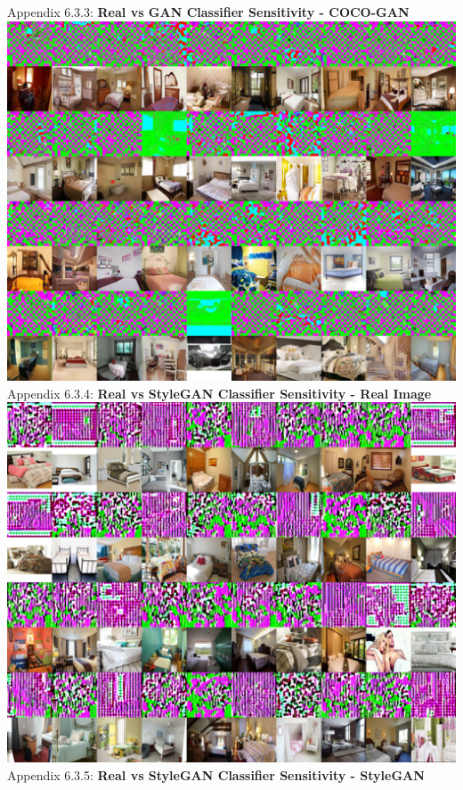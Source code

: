 \documentclass[10pt]{article}
\begin{document}
    \newpage
    Appendix 6.3.3: \textbf{Real vs GAN Classifier Sensitivity - COCO-GAN}\\
    \includegraphics[scale=1.05]{smoothgrad-big/combined_model/testing-3-2-combined-dataset-coco-smoothgrad.png}\\
    Appendix 6.3.4: \textbf{Real vs StyleGAN Classifier Sensitivity - Real Image}\\
    \includegraphics[scale=1.05]{smoothgrad-big/stylegan_model/testing-2-2-combined-dataset-raw-smoothgrad.png}
    \newpage
    Appendix 6.3.5: \textbf{Real vs StyleGAN Classifier Sensitivity - StyleGAN}\\
\end{document}
